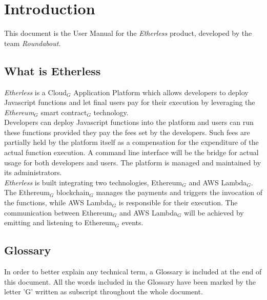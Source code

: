 \section{Introduction}
This document is the User Manual for the \textit{Etherless} product, developed by the team \textit{Roundabout}.
\subsection{What is Etherless}
\textit{Etherless} is a Cloud$_{G}$ Application Platform which allows developers to deploy Javascript functions and let final users pay for their execution by leveraging the \textit{Ethereum$_{G}$} smart contract$_{G}$ technology.\\
Developers can deploy Javascript functions into the platform and users can run these functions provided they pay the fees set by the developers. Such fees are partially held by the platform itself as a compensation for the expenditure of the actual function execution. A command line interface will be the bridge for actual usage for both developers and users. The platform is managed and maintained by its administrators.\\
\textit{Etherless} is built integrating two technologies, Ethereum$_{G}$ and AWS Lambda$_{G}$. The Ethereum$_{G}$ blockchain$_{G}$ manages the payments and triggers the invocation of the functions, while AWS Lambda$_{G}$ is responsible for their execution. The communication between Ethereum$_{G}$ and AWS Lambda$_{G}$ will be achieved by emitting and listening to Ethereum$_{G}$ events.

\subsection{Glossary}
In order to better explain any technical term, a Glossary is included at the end of this document. All the words included in the Glossary have been marked by the letter 'G' written as subscript throughout the whole document.